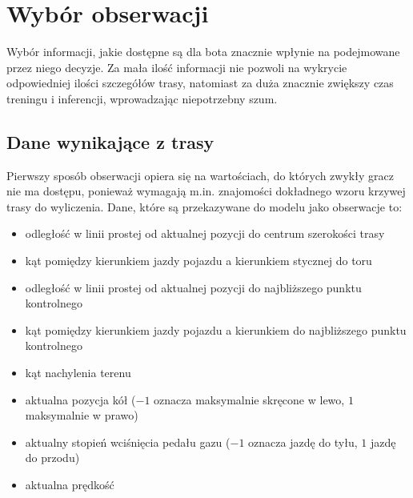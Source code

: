 \section{Wybór obserwacji}
Wybór informacji, jakie dostępne są dla bota znacznie wpłynie na podejmowane przez niego decyzje. Za mała ilość informacji nie pozwoli na wykrycie odpowiedniej ilości szczegółów trasy, natomiast za duża znacznie zwiększy czas treningu i inferencji, wprowadzając niepotrzebny szum.

\subsection{Dane wynikające z trasy}
Pierwszy sposób obserwacji opiera się na wartościach, do których zwykły gracz nie ma dostępu, ponieważ wymagają m.in. znajomości dokładnego wzoru  krzywej trasy do wyliczenia. Dane, które są przekazywane do modelu jako obserwacje to:
\begin{itemize}
    \item odległość w linii prostej od aktualnej pozycji do centrum szerokości trasy
    \item kąt pomiędzy kierunkiem jazdy pojazdu a kierunkiem stycznej do toru
    \item odległość w linii prostej od aktualnej pozycji do najbliższego punktu kontrolnego
    \item kąt pomiędzy kierunkiem jazdy pojazdu a kierunkiem do najbliższego punktu kontrolnego
    \item kąt nachylenia terenu
    \item aktualna pozycja kół ($-1$ oznacza maksymalnie skręcone w lewo, $1$ maksymalnie w prawo)
    \item aktualny stopień wciśnięcia pedału gazu ($-1$ oznacza jazdę do tyłu, $1$ jazdę do przodu)
    \item aktualna prędkość
\end{itemize}

